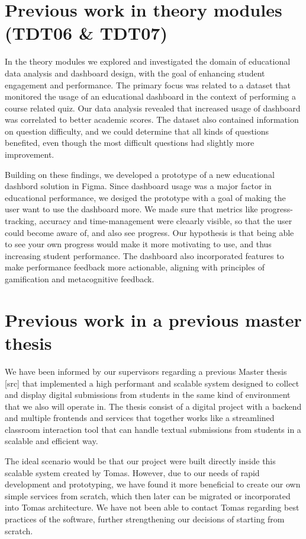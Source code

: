 \section{Previous work in theory modules (TDT06 \& TDT07)}
In the theory modules we explored and investigated the domain of educational data analysis and dashboard design, with the goal of enhancing student engagement and performance. The primary focus was related to a dataset that monitored the usage of an educational dashboard in the context of performing a course related quiz. Our data analysis revealed that increased usage of dashboard was correlated to better academic scores. The dataset also contained information on question difficulty, and we could determine that all kinds of questions benefited, even though the most difficult questions had slightly more improvement.

Building on these findings, we developed a prototype of a new educational dashbord solution in Figma. Since dashboard usage was a major factor in educational performance, we desiged the prototype with a goal of making the user want to use the dashboard more. We made sure that metrics like progress-tracking, accuracy and time-management were cleaarly visible, so that the user could become aware of, and also see progress. Our hypothesis is that being able to see your own progress would make it more motivating to use, and thus increasing student performance. The dashboard also incorporated features to make performance feedback more actionable, aligning with principles of gamification and metacognitive feedback.

\section{Previous work in a previous master thesis}
We have been informed by our supervisors regarding a previous Master thesis  [src] that implemented a high performant and scalable system designed to collect and display digital submissions from students in the same kind of environment that we also will operate in. The thesis consist of a digital project with a backend and multiple frontends and services that together works like a streamlined classroom interaction tool that can handle textual submissions from students in a scalable and efficient way.

The ideal scenario would be that our project were built directly inside this scalable system created by Tomas. However, due to our needs of rapid development and prototyping, we have found it more beneficial to create our own simple services from scratch, which then later can be migrated or incorporated into Tomas architecture. We have not been able to contact Tomas regarding best practices of the software, further strengthening our decisions of starting from scratch.

